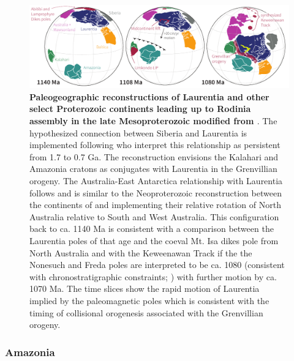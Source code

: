 \documentclass[twocolumn, switch]{article} %
\begin{document}
\begin{figure}
\centering
\includegraphics[width=\textwidth]{../Figures/Fig8_Grenville_Reconstruction.pdf}
\caption{\textbf{Paleogeographic reconstructions of Laurentia and other select Proterozoic continents leading up to Rodinia assembly in the late Mesoproterozoic modified from \cite{Swanson-Hysell2019a}}. The hypothesized connection between Siberia and Laurentia is implemented following \cite{Evans2016b} who interpret this relationship as persistent from 1.7 to 0.7 Ga. The reconstruction envisions the Kalahari and Amazonia cratons as conjugates with Laurentia in the Grenvillian orogeny. The Australia-East Antarctica relationship with Laurentia follows \cite{Swanson-Hysell2012a} and is similar to the Neoproterozoic reconstruction between the continents of \cite{Li2011a} and implementing their relative rotation of North Australia relative to South and West Australia. This configuration back to ca. 1140 Ma is consistent with a comparison between the Laurentia poles of that age and the coeval Mt. Isa dikes pole from North Australia and with the Keweenawan Track if the the Nonesuch and Freda poles are interpreted to be ca. 1080 (consistent with chronostratigraphic constraints; \citealp{Slotznick2018a}) with further motion by ca. 1070 Ma. The time slices show the rapid motion of Laurentia implied by the paleomagnetic poles which is consistent with the timing of collisional orogenesis associated with the Grenvillian orogeny.}
\label{fig:Grenville_reconstructions}
\end{figure}

\subsubsection{Amazonia}
\end{document}
